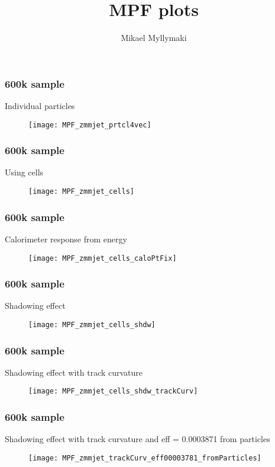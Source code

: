 \documentclass{beamer}
\title{MPF plots}
\author{Mikael Myllymaki}
\begin{document}
 
\frame{\titlepage}





\begin{frame}
\frametitle{600k sample}
Individual particles
\vspace{\baselineskip}
\begin{figure}[H]
\texttt{[image: MPF\_zmmjet\_prtcl4vec]}
\centering
\end{figure}
\end{frame}


\begin{frame}
\frametitle{600k sample}
Using cells
\vspace{\baselineskip}
\begin{figure}[H]
\texttt{[image: MPF\_zmmjet\_cells]}
\centering
\end{figure}
\end{frame}

\begin{frame}
\frametitle{600k sample}
Calorimeter response from energy
\vspace{\baselineskip}
\begin{figure}[H]
\texttt{[image: MPF\_zmmjet\_cells\_caloPtFix]}
\centering
\end{figure}
\end{frame}

\begin{frame}
\frametitle{600k sample}
Shadowing effect
\vspace{\baselineskip}
\begin{figure}[H]
\texttt{[image: MPF\_zmmjet\_cells\_shdw]}
\centering
\end{figure}
\end{frame}

\begin{frame}
\frametitle{600k sample}
Shadowing effect with track curvature
\vspace{\baselineskip}
\begin{figure}[H]
\texttt{[image: MPF\_zmmjet\_cells\_shdw\_trackCurv]}
\centering
\end{figure}
\end{frame}

\begin{frame}
\frametitle{600k sample}
Shadowing effect with track curvature and eff = 0.0003871 from particles
\begin{figure}[H]
\texttt{[image: MPF\_zmmjet\_trackCurv\_eff00003781\_fromParticles]}
\centering
\end{figure}
\end{frame}
\end{document}
